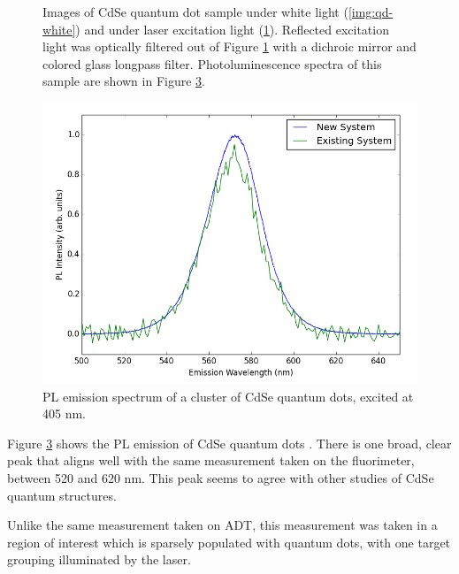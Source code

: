 \begin{figure}[H]
\begin{subfigure}[b]{0.45\textwidth}
        \caption{}
        \label{img:qd-laser}
    \end{subfigure}
    \caption[Images of CdSe quantum dot sample under white light and under laser excitation light.]{Images of CdSe quantum dot sample under white light (\ref{img:qd-white}) and under laser excitation light (\ref{img:qd-laser}). Reflected excitation light was optically filtered out of Figure \ref{img:qd-laser} with a dichroic mirror and colored glass longpass filter. Photoluminescence spectra of this sample are shown in Figure \ref{fig:pl-adt-qd}.}
    \label{img:qd}
\end{figure}

\begin{figure}[H]
    \centering
    \includegraphics[width=\textwidth]{./img/qd-2.png}
    \caption{PL emission spectrum of a cluster of CdSe quantum dots, excited at 405 nm.}
    \label{fig:pl-adt-qd}
\end{figure}

Figure \ref{fig:pl-adt-qd} shows the PL emission of CdSe quantum dots . There is one broad, clear peak that aligns well with the same measurement taken on the fluorimeter, between 520 and 620 nm. This peak seems to agree with other studies of CdSe quantum structures.\cite{empedocles_photoluminescence_1996}

Unlike the same measurement taken on ADT, this measurement was taken in a region of interest which is sparsely populated with quantum dots, with one target grouping illuminated by the laser.

